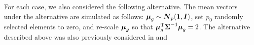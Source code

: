 \documentclass[APA,Times1COL]{WileyNJDv5} %
\def\trace{\hbox{trace}}
\def\trace{\hbox{trace}}
\def\trans{^{\rm T}}
\newcommand{\uI}       {\mbox{\boldmath$I$}}
\newcommand{\uN}       {\mbox{\boldmath$N$}}
\newcommand{\umu}               {\mbox{\boldmath$\mu$}}
\newcommand{\uSigma}            {\mbox{\boldmath$\Sigma$}}
\begin{document}
For each case, we also considered the following alternative. The mean vectors under the alternative are simulated as follows:
 $\umu_g \sim \uN_{p}(\bf{1}, \uI)$, set $p_0$ randomly selected elements to zero, and re-scale $\umu_g$ so that $\umu_g \trans\uSigma ^{-1}  \umu_g = 2$.
The alternative described above was also previously considered in \cite{srivastava2014raptt} and \cite{zoh2018powerful} %
\end{document}
